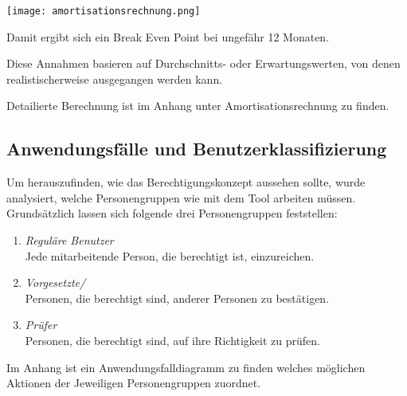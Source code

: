 \texttt{[image: amortisationsrechnung.png]}

Damit ergibt sich ein Break Even Point bei ungefähr 12 Monaten.

Diese Annahmen basieren auf Durchschnitts- oder Erwartungswerten, von denen realistischerweise ausgegangen werden kann.

Detailierte Berechnung ist im Anhang unter Amortisationsrechnung zu finden. \todo

\subsection{Anwendungsfälle und Benutzerklassifizierung}
\label{sec:Analysephase:Benutzerklassifizierung}

Um herauszufinden, wie das Berechtigungskonzept aussehen sollte, wurde analysiert, welche Personengruppen wie mit dem Tool arbeiten müssen.
Grundsätzlich lassen sich folgende drei Personengruppen feststellen:

\begin{enumerate}
    \item \emph{Reguläre Benutzer}\\
    Jede mitarbeitende Person, die berechtigt ist,  einzureichen.
    \item \emph{Vorgesetzte/}\\
    Personen, die berechtigt sind,  anderer Personen zu bestätigen.
    \item \emph{Prüfer}\\
    Personen, die berechtigt sind,  auf ihre Richtigkeit zu prüfen.
\end{enumerate}

Im Anhang ist ein Anwendungsfalldiagramm zu finden welches möglichen Aktionen der Jeweiligen Personengruppen zuordnet.\todo